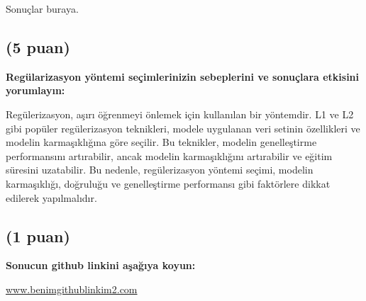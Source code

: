 \documentclass[11pt]{article}
\begin{document}
Sonuçlar buraya.

\subsection{(5 puan)} \textbf{Regülarizasyon yöntemi seçimlerinizin sebeplerini ve sonuçlara etkisini yorumlayın:}

Regülerizasyon, aşırı öğrenmeyi önlemek için kullanılan bir yöntemdir. L1 ve L2 gibi popüler regülerizasyon teknikleri, modele uygulanan veri setinin özellikleri ve modelin karmaşıklığına göre seçilir. Bu teknikler, modelin genelleştirme performansını artırabilir, ancak modelin karmaşıklığını artırabilir ve eğitim süresini uzatabilir. Bu nedenle, regülerizasyon yöntemi seçimi, modelin karmaşıklığı, doğruluğu ve genelleştirme performansı gibi faktörlere dikkat edilerek yapılmalıdır.



\subsection{(1 puan)} \textbf{Sonucun github linkini  aşağıya koyun:}

\url{www.benimgithublinkim2.com}
\end{document}
